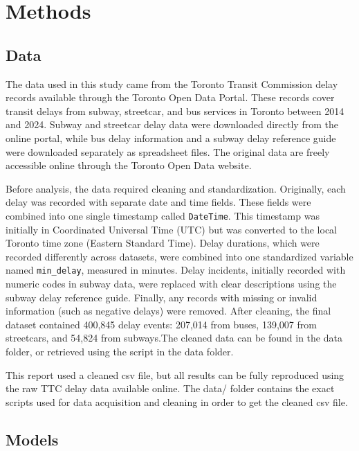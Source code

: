 \documentclass[
]{article}
\begin{document}
\section{Methods}\label{methods}

\subsection{Data}\label{data}

The data used in this study came from the Toronto Transit Commission
delay records available through the Toronto Open Data Portal. These
records cover transit delays from subway, streetcar, and bus services in
Toronto between 2014 and 2024. Subway and streetcar delay data were
downloaded directly from the online portal, while bus delay information
and a subway delay reference guide were downloaded separately as
spreadsheet files. The original data are freely accessible online
through the Toronto Open Data website.

Before analysis, the data required cleaning and standardization.
Originally, each delay was recorded with separate date and time fields.
These fields were combined into one single timestamp called
\texttt{DateTime}. This timestamp was initially in Coordinated Universal
Time (UTC) but was converted to the local Toronto time zone (Eastern
Standard Time). Delay durations, which were recorded differently across
datasets, were combined into one standardized variable named
\texttt{min\_delay}, measured in minutes. Delay incidents, initially
recorded with numeric codes in subway data, were replaced with clear
descriptions using the subway delay reference guide. Finally, any
records with missing or invalid information (such as negative delays)
were removed. After cleaning, the final dataset contained 400,845 delay
events: 207,014 from buses, 139,007 from streetcars, and 54,824 from
subways.The cleaned data can be found in the data folder, or retrieved
using the script in the data folder.

This report used a cleaned csv file, but all results can be fully
reproduced using the raw TTC delay data available online. The data/
folder contains the exact scripts used for data acquisition and cleaning
in order to get the cleaned csv file.

\subsection{Models}\label{models}
\end{document}
